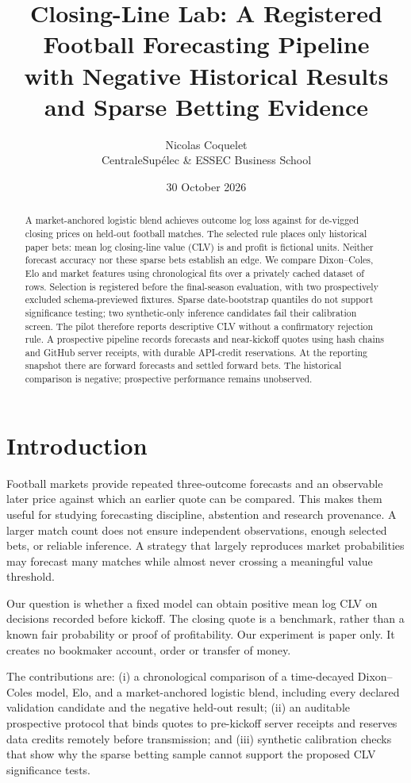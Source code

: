 \documentclass[11pt]{article}
\title{Closing-Line Lab: A Registered Football Forecasting Pipeline\\with Negative Historical Results and Sparse Betting Evidence}
\author{Nicolas Coquelet\\CentraleSup\'elec \& ESSEC Business School}
\date{30 October 2026}
\begin{document}
\maketitle
\begin{abstract}
A market-anchored logistic blend achieves outcome log loss \testLoss{} against
\closingLoss{} for de-vigged closing prices on \testMatches{} held-out football matches.
The selected rule places only \testBets{} historical paper bets: mean log closing-line
value (CLV) is \testClv{} and profit is \testProfit{} fictional units. Neither forecast
accuracy nor these sparse bets establish an edge. We compare Dixon--Coles, Elo and market
features using chronological fits over a privately cached dataset of \researchRows{}
rows. Selection is registered before the final-season evaluation, with two prospectively
excluded schema-previewed fixtures. Sparse date-bootstrap quantiles do not support significance testing; two synthetic-only
inference candidates fail their calibration screen. The pilot therefore reports descriptive
CLV without a confirmatory rejection rule. A prospective
pipeline records forecasts and near-kickoff quotes using hash chains and GitHub server
receipts, with durable API-credit reservations. At the reporting snapshot there are
\forwardForecasts{} forward forecasts and \settledForwardBets{} settled forward bets.
The historical comparison is negative; prospective performance remains unobserved.
\end{abstract}

\section{Introduction}
Football markets provide repeated three-outcome forecasts and an observable later price
against which an earlier quote can be compared. This makes them useful for studying
forecasting discipline, abstention and research provenance. A larger match count does not
ensure independent observations, enough selected bets, or reliable inference. A strategy
that largely reproduces market probabilities may forecast many matches while almost never
crossing a meaningful value threshold.

Our question is whether a fixed model can obtain positive mean log CLV on decisions
recorded before kickoff. The closing quote is a benchmark, rather than a known fair
probability or proof of profitability. Our experiment is paper only. It creates no
bookmaker account, order or transfer of money.

The contributions are: (i) a chronological comparison of a time-decayed Dixon--Coles
model, Elo, and a market-anchored logistic blend, including every declared validation
candidate and the negative held-out result; (ii) an auditable prospective protocol that
binds quotes to pre-kickoff server receipts and reserves data credits remotely before
transmission; and (iii) synthetic calibration checks that show why the sparse betting sample
cannot support the proposed CLV significance tests.
\end{document}
